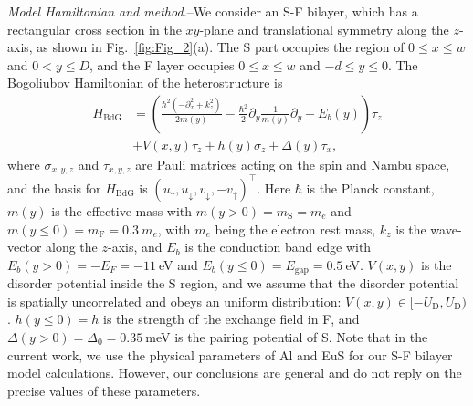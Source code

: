 \documentclass[aps,prl,twocolumn,superscriptaddress,showpacs,longbibliography]{revtex4-1}
\newcommand{\su}{\uparrow}
\newcommand{\sd}{\downarrow}
\newcommand{\nn}{\nonumber \\}
\newcommand{\tp}{ ^{\intercal} }
\begin{document}
\emph{Model Hamiltonian and method.}--We consider an S-F bilayer, which has a rectangular cross section in the $xy$-plane and translational symmetry along the $z$-axis, as shown in Fig.~\ref{fig:Fig_2}(a).
The S part occupies the region of $0 \leq x \leq w$ and $0 < y \leq D$, and the F layer occupies $0 \leq x \leq w$ and $-d \leq y \leq 0$.
The Bogoliubov Hamiltonian of the heterostructure is
\begin{align}
H_{\text{BdG}} &= \left( \frac{\hbar^2(-\partial^2_x +  k^2_z)}{2 m(y)}  -\frac{\hbar^2}{2} \partial_y \frac{1}{m(y)} \partial_y + E_b(y)   \right) \tau_z \nn
&+ V(x, y) \tau_z + h(y) \sigma_z + \Delta(y) \tau_x,
\label{eq:H_BdG}
\end{align}
where $\sigma_{x,y,z}$ and $\tau_{x,y,z}$ are Pauli matrices acting on the spin and Nambu space, and the basis for $H_{\text{BdG}}$ is $(u_{\su}, u_{\sd}, v_{\sd}, -v_{\su})\tp$. Here $\hbar$ is the Planck constant, $m(y)$ is the effective mass with $m(y>0) = m_{\text{S}}= m_e$ and $m(y \leq 0) = m_{\text{F}}= 0.3~m_e$, with $m_e$ being the electron rest mass, $k_z$ is the wave-vector along the $z$-axis, and $E_b$ is the conduction band edge with $E_b(y>0) = -E_F = -11~$eV and $E_b(y \leq 0) = E_{\text{gap}} = 0.5~$eV. $V(x,y)$ is the disorder potential inside the S region, and we assume that the disorder potential is spatially uncorrelated and obeys an uniform distribution: $ V(x,y) \in [-U_{\text{D}}, U_{\text{D}})$. $h(y \leq 0) = h$  is the strength of the exchange field in F, and $\Delta(y>0) = \Delta_0=0.35~$meV is the pairing potential of S. Note that in the current work, we use the physical parameters of Al and EuS for our S-F bilayer model calculations. 
However, our conclusions are general and do not reply on the precise values of these parameters.
\end{document}
